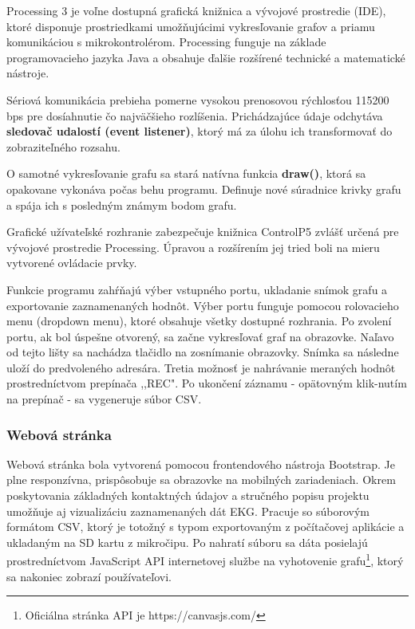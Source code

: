 \documentclass[titlepage,12pt]{article}
\begin{document}
Processing 3 je voľne dostupná grafická knižnica a vývojové prostredie (IDE), ktoré disponuje prostriedkami umožňujúcimi vykresľovanie grafov a priamu komunikáciou s mikrokontrolérom. Processing funguje na základe programovacieho jazyka Java a obsahuje ďalšie rozšírené technické a matematické nástroje. 

Sériová komunikácia prebieha pomerne vysokou prenosovou rýchlosťou 115200 bps pre dosíahnutie čo najväčšieho rozlíšenia. Prichádzajúce údaje odchytáva \textbf{sledovač udalostí (event listener)}, ktorý má za úlohu ich transformovať do zobraziteľného rozsahu.

O samotné vykresľovanie grafu sa stará natívna funkcia \textbf{draw()}, ktorá sa opakovane vykonáva počas behu programu. Definuje nové súradnice krivky grafu a spája ich s posledným známym bodom grafu.

Grafické užívateľské rozhranie zabezpečuje knižnica ControlP5 zvlášť určená pre vývojové prostredie Processing. Úpravou a rozšírením jej tried boli na mieru vytvorené ovládacie prvky.  

Funkcie programu zahŕňajú výber vstupného portu, ukladanie snímok grafu a exportovanie zaznamenaných hodnôt. Výber portu funguje pomocou rolovacieho menu (dropdown menu), ktoré obsahuje všetky dostupné rozhrania. Po zvolení portu, ak bol úspešne otvorený, sa začne vykresľovať graf na obrazovke. Naľavo od tejto lišty sa nachádza tlačidlo na zosnímanie obrazovky. Snímka sa následne uloží do predvoleného adresára. Tretia možnosť je nahrávanie meraných hodnôt prostredníctvom prepínača ,,REC". Po ukončení záznamu - opätovným klik-nutím na prepínač - sa vygeneruje súbor CSV.

\subsubsection{Webová stránka}
Webová stránka bola vytvorená pomocou frontendového nástroja Bootstrap. Je plne \linebreak responzívna, prispôsobuje sa obrazovke na mobilných zariadeniach. Okrem poskytovania \linebreak základných kontaktných údajov a stručného popisu projektu umožňuje aj vizualizáciu zaznamenaných dát EKG. Pracuje so súborovým formátom CSV, ktorý je totožný s typom exportovaným z počítačovej aplikácie a ukladaným na SD kartu z mikročipu. Po nahratí súboru sa dáta posielajú prostredníctvom JavaScript API internetovej službe na vyhotovenie grafu\footnote{Oficiálna stránka API je https://canvasjs.com/}, ktorý sa nakoniec zobrazí používateľovi. 
\end{document}

